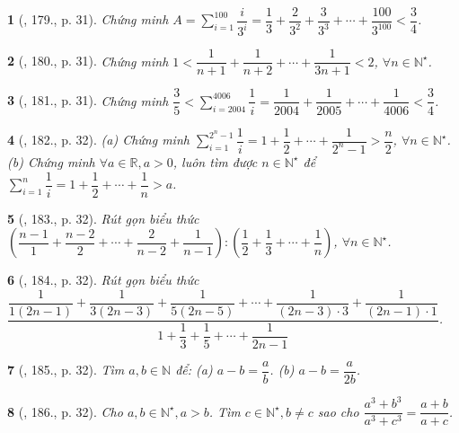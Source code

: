 \documentclass{article}
\newtheorem{baitoan}{}
\begin{document}
\begin{baitoan}[\cite{Binh_Toan_8_tap_1}, 179., p. 31]
	Chứng minh $A = \sum_{i=1}^{100} \dfrac{i}{3^i} = \dfrac{1}{3} + \dfrac{2}{3^2} + \dfrac{3}{3^3} + \cdots + \dfrac{100}{3^{100}} < \dfrac{3}{4}$.
\end{baitoan}

\begin{baitoan}[\cite{Binh_Toan_8_tap_1}, 180., p. 31]
	Chứng minh $1 < \dfrac{1}{n + 1} + \dfrac{1}{n + 2} + \cdots + \dfrac{1}{3n + 1} < 2$, $\forall n\in\mathbb{N}^\star$.
\end{baitoan}

\begin{baitoan}[\cite{Binh_Toan_8_tap_1}, 181., p. 31]
	Chứng minh $\dfrac{3}{5} < \sum_{i=2004}^{4006} \dfrac{1}{i} = \dfrac{1}{2004} + \dfrac{1}{2005} + \cdots + \dfrac{1}{4006} < \dfrac{3}{4}$.
\end{baitoan}

\begin{baitoan}[\cite{Binh_Toan_8_tap_1}, 182., p. 32]
	(a) Chứng minh $\sum_{i=1}^{2^n - 1} \dfrac{1}{i} = 1 + \dfrac{1}{2} + \cdots + \dfrac{1}{2^n - 1} > \dfrac{n}{2}$, $\forall n\in\mathbb{N}^\star$. (b) Chứng minh $\forall a\in\mathbb{R},a > 0$, luôn tìm được $n\in\mathbb{N}^\star$ để $\sum_{i=1}^n \dfrac{1}{i} = 1 + \dfrac{1}{2} + \cdots + \dfrac{1}{n} > a$.
\end{baitoan}

\begin{baitoan}[\cite{Binh_Toan_8_tap_1}, 183., p. 32]
	Rút gọn biểu thức $\left(\dfrac{n - 1}{1} + \dfrac{n - 2}{2} + \cdots + \dfrac{2}{n - 2} + \dfrac{1}{n - 1}\right):\left(\dfrac{1}{2} + \dfrac{1}{3} + \cdots + \dfrac{1}{n}\right)$, $\forall n\in\mathbb{N}^\star$.
\end{baitoan}

\begin{baitoan}[\cite{Binh_Toan_8_tap_1}, 184., p. 32]
	Rút gọn biểu thức $\dfrac{\dfrac{1}{1(2n - 1)} + \dfrac{1}{3(2n - 3)} + \dfrac{1}{5(2n - 5)} + \cdots + \dfrac{1}{(2n - 3)\cdot3} + \dfrac{1}{(2n - 1)\cdot1}}{1 + \dfrac{1}{3} + \dfrac{1}{5} + \cdots + \dfrac{1}{2n - 1}}$.
\end{baitoan}

\begin{baitoan}[\cite{Binh_Toan_8_tap_1}, 185., p. 32]
	Tìm $a,b\in\mathbb{N}$ để: (a) $a - b = \dfrac{a}{b}$. (b) $a - b = \dfrac{a}{2b}$.
\end{baitoan}

\begin{baitoan}[\cite{Binh_Toan_8_tap_1}, 186., p. 32]
	Cho $a,b\in\mathbb{N}^\star,a > b$. Tìm $c\in\mathbb{N}^\star,b\ne c$ sao cho $\dfrac{a^3 + b^3}{a^3 + c^3} = \dfrac{a + b}{a + c}$.
\end{baitoan}
\end{document}
